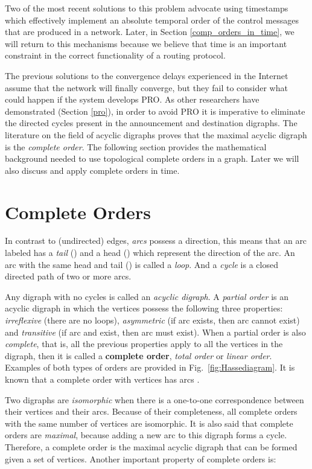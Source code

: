 \documentclass[5p,twocolumn]{elsarticle}
\begin{document}
Two of the most recent solutions to this problem \cite{Pei2005, Chandrashekar2005} advocate using timestamps which effectively implement an absolute temporal order of the control messages that are produced in a network. Later, in Section \ref{comp_orders_in_time}, we will return to this mechanisms because we believe that time is an important constraint in the correct functionality of a routing protocol.

The previous solutions to the convergence delays experienced in the Internet assume that the network will finally converge, but they fail to consider what could happen if the system develops PRO. As other researchers have demonstrated (Section \ref{pro}), in order to avoid PRO it is imperative to eliminate the directed cycles present in the announcement and destination digraphs. The literature on the field of acyclic digraphs \cite{Harary1965, Bang-Jensen2002} proves that the maximal acyclic digraph is the \emph{complete order}. The following section provides the mathematical background needed to use topological complete orders in a graph. Later we will also discuss and apply complete orders in time.




\section{Complete Orders}\label{comp_orders}
In contrast to (undirected) edges, \emph{arcs} possess a direction, this means that an arc labeled  has a \emph{tail} () and a head () which represent the direction of the arc. An arc with the same head and tail () is called a \emph{loop}. And a \emph{cycle} is a closed directed path of two or more arcs.

Any digraph with no cycles is called an \emph{acyclic digraph}. A \emph{partial order} is an acyclic digraph in which the vertices possess the following three properties: \emph{irreflexive} (there are no loops), \emph{asymmetric} (if arc  exists, then arc  cannot exist) and \emph{transitive} (if arc  and  exist, then arc  must exist). When a partial order is also \emph{complete}, that is, all the previous properties apply to all the vertices in the digraph, then it is called a \textbf{complete order}, \emph{total order} or \emph{linear order}. Examples of both types of orders are provided in Fig.\ \ref{fig:Hassediagram}. It is known that a complete order with  vertices has  arcs \cite{Harary1965}.

Two digraphs are \emph{isomorphic} when there is a one-to-one correspondence between their vertices and their arcs. Because of their completeness, all complete orders with the same number of vertices are isomorphic. It is also said that complete orders are \emph{maximal}, because adding a new arc to this digraph forms a cycle. Therefore, a complete order is the maximal acyclic digraph that can be formed given a set of vertices. Another important property of complete orders is:
\end{document}
